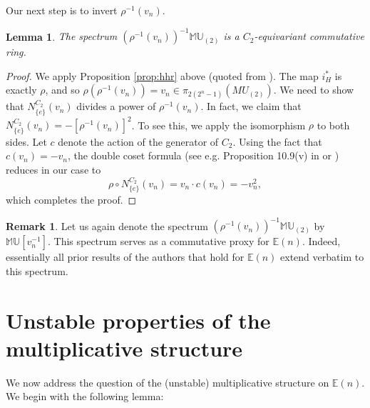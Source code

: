 \documentclass[12pt]{amsart}
\numberwithin{equation}{section}
\theoremstyle{plain}  %
\newtheorem{lemma}[equation]{Lemma}
\theoremstyle{definition}  %
\newtheorem{remark}[equation]{Remark}
\newcommand{\MU}{\mathbb {MU}}
\newcommand{\E}{\mathbb{E}}
\begin{document}
Our next step is to invert $\rho^{-1}(v_n)$.

\medskip
\begin{lemma} The spectrum $(\rho^{-1}(v_n))^{-1}\MU_{(2)}$ is a $C_2$-equivariant commutative ring. \end{lemma}
\begin{proof} We apply Proposition \ref{prop:hhr}  above (quoted from \cite{HHR16}). The map $i_H^*$ is exactly $\rho$, and so $\rho(\rho^{-1}(v_n))=v_n \in \pi_{2(2^n-1)}(MU_{(2)})$. We need to show that $N_{\{e\}}^{C_2}(v_n)$ divides a power of $\rho^{-1}(v_n)$. In fact, we claim that $N_{\{e\}}^{C_2}(v_n)=-[\rho^{-1}(v_n)]^2$. To see this, we apply the isomorphism $\rho$ to both sides. Let $c$ denote the action of the generator of $C_2$. Using the fact that $c(v_n)=-v_n$, the double coset formula (see e.g. Proposition 10.9(v) in \cite{Sch15} or \cite{May96}) reduces in our case to
$$\rho \circ N_{\{e\}}^{C_2}(v_n)=v_n \cdot c(v_n)=-v_n^2,$$
which completes the proof.
\end{proof}

\medskip
\begin{remark}
Let us again denote the spectrum $(\rho^{-1}(v_n))^{-1}\MU_{(2)}$ by $\MU[v_n^{-1}]$. This spectrum serves as a commutative proxy for $\E(n)$. Indeed, essentially all prior results of the authors that hold for $\E(n)$ extend verbatim to this spectrum. 
\end{remark}

\section{Unstable properties of the multiplicative structure}
\medskip
\noindent
We now address the question of the (unstable) multiplicative structure on $\E(n)$. We begin with the following lemma:
\end{document}
